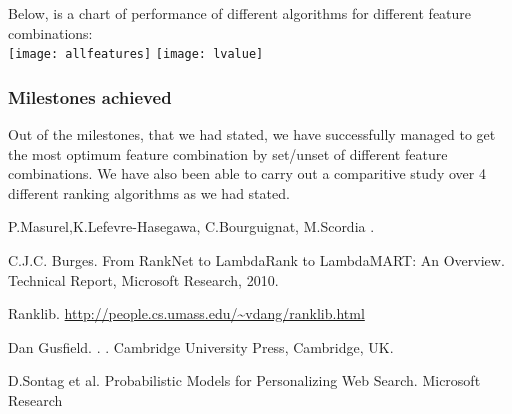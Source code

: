 \documentclass[11pt,letterpaper]{article}
\begin{document}
Below, is a chart of performance of different algorithms for different feature combinations:\\ 
\texttt{[image: allfeatures]}
\texttt{[image: lvalue]}

\subsubsection*{Milestones achieved}
Out of the milestones, that we had stated, we have successfully managed to get the most optimum feature combination by set/unset of different feature combinations. We have also been able to carry out a comparitive study over 4 different ranking algorithms as we had stated. %

\begin{thebibliography}{}


P.Masurel,K.Lefevre-Hasegawa, C.Bourguignat, M.Scordia 
.


\bibitem[2] C.J.C. Burges. From RankNet to LambdaRank to
LambdaMART: An Overview. Technical Report, Microsoft Research, 2010.

\bibitem[3] Ranklib.
\url{http://people.cs.umass.edu/~vdang/ranklib.html}

Dan Gusfield.
.
.
\newblock Cambridge University Press, Cambridge, UK.

\bibitem[4] D.Sontag et al. Probabilistic Models for Personalizing Web Search.
Microsoft Research


\end{thebibliography}
\end{document}
